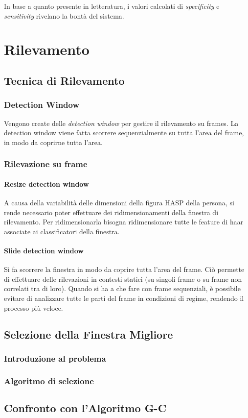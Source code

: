             In base a quanto presente in letteratura, i valori calcolati di \emph{specificity} e \emph{sensitivity} rivelano la bontà del sistema.


\chapter{Rilevamento}
\label{chap:rilevamento}
    \section{Tecnica di Rilevamento}
    \label{sec:detection_tecnique}
        \subsection{Detection Window}
            Vengono create delle \emph{detection window} per gestire il rilevamento su frames.
            La detection window viene fatta scorrere sequenzialmente su tutta l'area del frame, in modo da coprirne tutta l'area.
        \subsection{Rilevazione su frame}
            \subsubsection{Resize detection window}
                A causa della variabilità delle dimensioni della figura HASP della persona, si rende necessario poter effettuare dei ridimensionamenti della finestra di rilevamento. 
                Per ridimensionarla bisogna ridimensionare tutte le feature di haar associate ai classificatori della finestra.
            \subsubsection{Slide detection window}
                Si fa scorrere la finestra in modo da coprire tutta l'area del frame.
                Ciò permette di effettuare delle rilevazioni in contesti statici (su singoli frame o su frame non correlati tra di loro).
                Quando si ha a che fare con frame sequenziali, è possibile evitare di analizzare tutte le parti del frame in condizioni di regime, rendendo il processo più veloce.
    \section{Selezione della Finestra Migliore} %
    \label{sec:best_detection_window}
        \subsection{Introduzione al problema}
        \subsection{Algoritmo di selezione}
    \section{Confronto con l'Algoritmo G-C} %
    \label{sec:gc_algorithm_comparison}